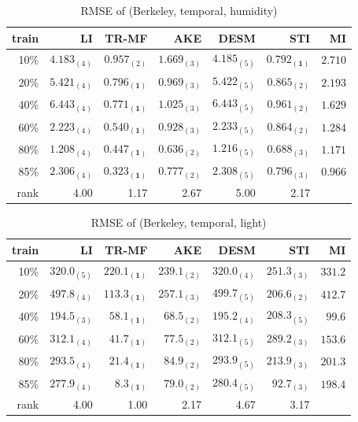 \begin{table}[htbp]
\setlength{\tabcolsep}{2pt}
\centering
\caption{RMSE of (Berkeley, temporal, humidity)}
\label{table:berkeley_temporal_hum}
\begin{tabular}{ r | r r r r r r}
	train	&LI	&TR-MF	&AKE	&DESM	&STI &MI\\ \hline
	10\% & $ 4.183_{(4)} $ & $ 0.957_{(2)} $ & $ 1.669_{(3)} $ & $ 4.185_{(5)} $ & $ \mathbf{ 0.792_{(1)} } $&$2.710$  \\
	20\% & $ 5.421_{(4)} $ & $ \mathbf{ 0.796_{(1)} } $ & $ 0.969_{(3)} $ & $ 5.422_{(5)} $ & $ 0.865_{(2)} $ &$2.193$ \\
	40\% & $ 6.443_{(4)} $ & $ \mathbf{ 0.771_{(1)} } $ & $ 1.025_{(3)} $ & $ 6.443_{(5)} $ & $ 0.961_{(2)} $ &$1.629$ \\
	60\% & $ 2.223_{(4)} $ & $ \mathbf{ 0.540_{(1)} } $ & $ 0.928_{(3)} $ & $ 2.233_{(5)} $ & $ 0.864_{(2)} $ &$1.284$ \\
	80\% & $ 1.208_{(4)} $ & $ \mathbf{ 0.447_{(1)} } $ & $ 0.636_{(2)} $ & $ 1.216_{(5)} $ & $ 0.688_{(3)} $ &$1.171$  \\
	85\% & $ 2.306_{(4)} $ & $ \mathbf{ 0.323_{(1)} } $ & $ 0.777_{(2)} $ & $ 2.308_{(5)} $ & $ 0.796_{(3)} $ &$0.966$ \\ \hline
	rank &4.00 &1.17 &2.67 &5.00 &2.17 \\
\end{tabular}
\end{table}

\begin{table}[htbp]
\setlength{\tabcolsep}{2pt}
\centering
\caption{RMSE of (Berkeley, temporal, light)}
\label{table:berkeley_temporal_light}
\begin{tabular}{ r | r r r r r r}
	train	&LI	&TR-MF	&AKE	&DESM	&STI &MI\\ \hline
	10\% & $ 320.0_{(5)} $ & $ \mathbf{ 220.1_{(1)} } $ & $ 239.1_{(2)} $ & $ 320.0_{(4)} $ & $ 251.3_{(3)} $ &$331.2$ \\
	20\% & $ 497.8_{(4)} $ & $ \mathbf{ 113.3_{(1)} } $ & $ 257.1_{(3)} $ & $ 499.7_{(5)} $ & $ 206.6_{(2)} $ &$412.7$\\
	40\% & $ 194.5_{(3)} $ & $ \mathbf{ 58.1_{(1)} } $ & $ 68.5_{(2)} $ & $ 195.2_{(4)} $ & $ 208.3_{(5)} $ &$99.6$\\
	60\% & $ 312.1_{(4)} $ & $ \mathbf{ 41.7_{(1)} } $ & $ 77.5_{(2)} $ & $ 312.1_{(5)} $ & $ 289.2_{(3)} $ &$153.6$\\
	80\% & $ 293.5_{(4)} $ & $ \mathbf{ 21.4_{(1)} } $ & $ 84.9_{(2)} $ & $ 293.9_{(5)} $ & $ 213.9_{(3)} $ &$201.3$\\
	85\% & $ 277.9_{(4)} $ & $ \mathbf{ 8.3_{(1)} } $ & $ 79.0_{(2)} $ & $ 280.4_{(5)} $ & $ 92.7_{(3)} $ &$198.4$\\ \hline
	rank &4.00 &1.00 &2.17 &4.67 &3.17 \\
\end{tabular}
\end{table}



